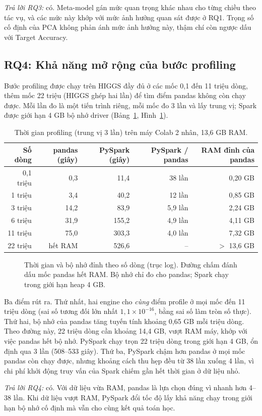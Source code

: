\emph{Trả lời RQ3:} có. Meta-model gán mức quan trọng khác nhau cho từng chiều theo tác vụ, và các mức này khớp với mức ảnh hưởng quan sát được ở RQ1. Trọng số cố định của PCA không phản ánh mức ảnh hưởng này, thậm chí còn ngược dấu với Target Accuracy.

\subsection{RQ4: Khả năng mở rộng của bước profiling}
\label{sec:rq4}

Bước profiling được chạy trên HIGGS đầy đủ ở các mốc 0,1 đến 11 triệu dòng, thêm mốc 22 triệu (HIGGS ghép hai lần) để tìm điểm pandas không còn chạy được. Mỗi lần đo là một tiến trình riêng, mỗi mốc đo 3 lần và lấy trung vị; Spark được giới hạn 4 GB bộ nhớ driver (Bảng~\ref{tab:scale}, Hình~\ref{fig:h10}).

\begin{table}[ht]
\centering
\small
\begin{tabular}{@{}rrrrr@{}}
\toprule
Số dòng & pandas (giây) & PySpark (giây) & PySpark / pandas & RAM đỉnh của pandas \\
\midrule
0,1 triệu & 0,3  & 11,4  & 38 lần  & 0,20 GB \\
1 triệu   & 3,4  & 40,2  & 12 lần  & 0,85 GB \\
3 triệu   & 14,2 & 83,9  & 5,9 lần & 2,24 GB \\
6 triệu   & 31,9 & 155,2 & 4,9 lần & 4,11 GB \\
11 triệu  & 75,0 & 303,3 & 4,0 lần & 7,32 GB \\
22 triệu  & hết RAM & 526,6 & -- & $>$ 13,6 GB \\
\bottomrule
\end{tabular}
\caption{Thời gian profiling (trung vị 3 lần) trên máy Colab 2 nhân, 13,6 GB RAM.}
\label{tab:scale}
\end{table}

\begin{figure}[ht]
\centering
{}
\caption{Thời gian và bộ nhớ đỉnh theo số dòng (trục log). Đường chấm đánh dấu mốc pandas hết RAM. Bộ nhớ chỉ đo cho pandas; Spark chạy trong giới hạn heap 4 GB.}
\label{fig:h10}
\end{figure}

Ba điểm rút ra. Thứ nhất, hai engine cho \emph{cùng} điểm profile ở mọi mốc đến 11 triệu dòng (sai số tương đối lớn nhất $1{,}1\times10^{-16}$, bằng sai số làm tròn số thực). Thứ hai, bộ nhớ của pandas tăng tuyến tính khoảng 0,65 GB mỗi triệu dòng. Theo đường này, 22 triệu dòng cần khoảng 14,4 GB, vượt RAM máy, khớp với việc pandas hết bộ nhớ. PySpark chạy trọn 22 triệu dòng trong giới hạn 4 GB, ổn định qua 3 lần (508--533 giây). Thứ ba, PySpark chậm hơn pandas ở mọi mốc pandas còn chạy được, nhưng khoảng cách thu hẹp đều từ 38 lần xuống 4 lần, vì chi phí khởi động truy vấn của Spark chiếm gần hết thời gian ở dữ liệu nhỏ.

\emph{Trả lời RQ4:} có. Với dữ liệu vừa RAM, pandas là lựa chọn đúng vì nhanh hơn 4--38 lần. Khi dữ liệu vượt RAM, PySpark đổi tốc độ lấy khả năng chạy trong giới hạn bộ nhớ cố định mà vẫn cho cùng kết quả toán học.
